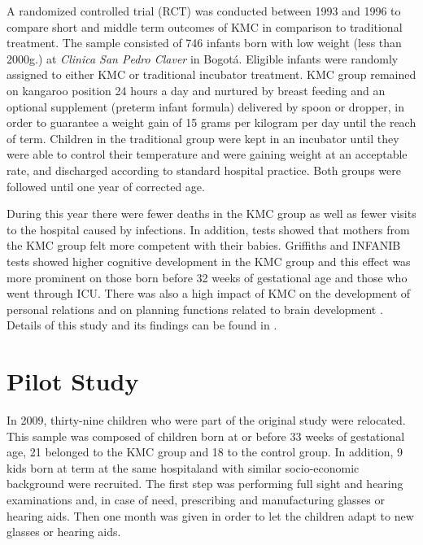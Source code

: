 A randomized controlled trial (RCT) was conducted between 1993 and 1996 to compare short and middle term outcomes of KMC in comparison to traditional treatment. The sample consisted of 746 infants born with low weight (less than 2000g.) at \emph{Clinica San Pedro Claver} in Bogotá. Eligible infants were randomly assigned to either KMC or traditional incubator treatment. KMC group remained on kangaroo position 24 hours a day and nurtured by breast feeding and an optional supplement (preterm infant formula) delivered by spoon or dropper, in order to guarantee a weight gain of 15 grams per kilogram per day until the reach of term. Children in the traditional group were kept in an incubator until they were able to control their temperature and were gaining weight at an acceptable rate, and discharged according to standard hospital practice. Both groups were followed until one year of corrected age. 

During this year there were fewer deaths in the KMC group as well as fewer visits to the hospital caused by infections. In addition, tests showed that mothers from the KMC group felt more competent with their babies. Griffiths and INFANIB tests showed higher cognitive development in the KMC group and this effect was more prominent on those born before 32 weeks of gestational age and those who went through ICU. There was also a high impact of KMC on the development of personal relations and on planning functions related to brain development \autocite{tessier_kangaroo_2003}. Details of this study and its findings can be found in \autocite{charpak_current_1996,charpak_kangaroo_1997,charpak_randomized_2001,charpak_kangaroo_2005}.



\section{Pilot Study}


In 2009, thirty-nine children who were part of the original study were relocated. This sample was composed of children born at or before 33 weeks of gestational age, 21 belonged to the KMC group and 18 to the control group. In addition, 9 kids born at term at the same hospitaland with similar socio-economic background were recruited. 
The first step was performing full sight and hearing examinations and, in case of need, prescribing and manufacturing glasses or hearing aids. Then one month was given in order to let the children adapt to new glasses or hearing aids. 

